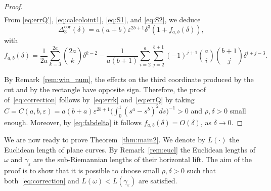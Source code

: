 \documentclass[12pt]{amsart}
\theoremstyle{plain}
\theoremstyle{definition}
\theoremstyle{remark}
\numberwithin{equation}{section}
\newcommand{\<}{\langle}
\renewcommand{\>}{\rangle}
\newcommand{\e}{\varepsilon}
\newcommand{\0}{\theta}
\newcommand{\w}{\omega}
\newcommand{\g}{\gamma}
\newcommand{\de}{\delta}
\newcommand{\De}{\Delta}
\newcommand{\1}{{-1}}
\newcommand{\cor}{\mathrm{cor}}
\renewcommand{\=}{\coloneqq}
\renewcommand{\.}{\dots}
\renewcommand{\-}{\cdot}
\renewcommand{\:}{\,:\,}
\theoremstyle{definition}
\begin{document}
\begin{proof}
\begin{align}
    \end{align}
    From \eqref{eq:errQ'}, \eqref{eq:calcoloint1}, \eqref{eq:S1}, and \eqref{eq:S2}, we deduce
    \begin{equation}
        \label{eq:errQ}
        \De_3^{\cor}(\de)=a(a+b)\e^{2b+1}\de^3(1+f_{a,b}(\de)),
    \end{equation}
    with
    \begin{equation}
        \label{eq:fabdelta}
        f_{a,b}(\de)= \frac{1}{2a} \sum_{k=3}^{2a}\binom{2a}{k}\de^{k-2} - \frac{1}{a(b+1)} \sum_{i=2}^{a}\sum_{j=2}^{b+1}(-1)^{j+1}\binom{a}{i}\binom{b+1}{j}\de^{i+j-3}.
    \end{equation}
    
    
	
	By Remark~\ref{rem:win_num}, the effects on the third coordinate produced by the cut and by the rectangle have opposite sign. Therefore, the proof of~\eqref{eq:correction} follows by~\eqref{eq:errk} and~\eqref{eq:errQ} by taking $C=C(a,b,\e)=a(b+a)\e^{2b+1}\big(\int_{0}^{1} (s^a-s^b)^2ds\big)^{-1}>0$ and $\rho,\de>0$ small enough. Moreover, by \eqref{eq:fabdelta} it follows $f_{a,b}(\de)=O(\de)$, as $\de\to0$.
\end{proof}


We are now ready to prove Theorem~\ref{thm:main2}. We denote by $L(\cdot)$ the Euclidean length of plane curves. By Remark~\ref{rem:eucl} the Euclidean lengths of $\w$ and $\g_\e$ are the sub-Riemannian lengths of their horizontal lift. The aim of the proof is to show that it is possible to choose small $\rho,\de>0$ such that both~\eqref{eq:correction} and $L(\w)<L(\g_\e)$ are satisfied. 
\end{document}
